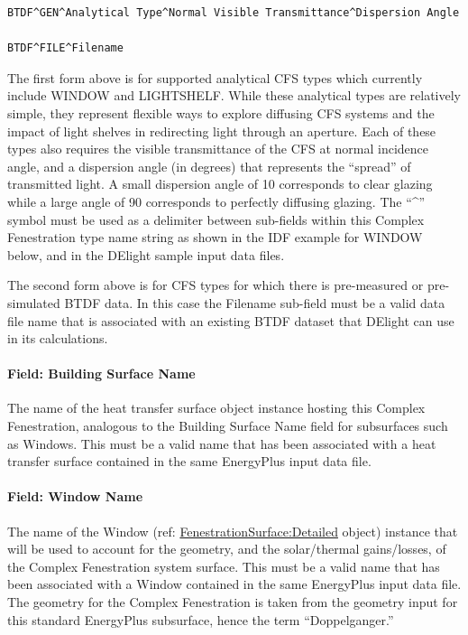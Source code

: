 \begin{lstlisting}
BTDF^GEN^Analytical Type^Normal Visible Transmittance^Dispersion Angle

BTDF^FILE^Filename

\end{lstlisting}

The first form above is for supported analytical CFS types which currently include WINDOW and LIGHTSHELF. While these analytical types are relatively simple, they represent flexible ways to explore diffusing CFS systems and the impact of light shelves in redirecting light through an aperture. Each of these types also requires the visible transmittance of the CFS at normal incidence angle, and a dispersion angle (in degrees) that represents the ``spread'' of transmitted light. A small dispersion angle of 10 corresponds to clear glazing while a large angle of 90 corresponds to perfectly diffusing glazing. The ``\^{}'' symbol must be used as a delimiter between sub-fields within this Complex Fenestration type name string as shown in the IDF example for WINDOW below, and in the DElight sample input data files.

The second form above is for CFS types for which there is pre-measured or pre-simulated BTDF data. In this case the Filename sub-field must be a valid data file name that is associated with an existing BTDF dataset that DElight can use in its calculations.

\paragraph{Field: Building Surface Name}\label{field-building-surface-name}

The name of the heat transfer surface object instance hosting this Complex Fenestration, analogous to the Building Surface Name field for subsurfaces such as Windows. This must be a valid name that has been associated with a heat transfer surface contained in the same EnergyPlus input data file.

\paragraph{Field: Window Name}\label{field-window-name}

The name of the Window (ref: \hyperref[fenestrationsurfacedetailed]{FenestrationSurface:Detailed} object) instance that will be used to account for the geometry, and the solar/thermal gains/losses, of the Complex Fenestration system surface. This must be a valid name that has been associated with a Window contained in the same EnergyPlus input data file. The geometry for the Complex Fenestration is taken from the geometry input for this standard EnergyPlus subsurface, hence the term ``Doppelganger.''

